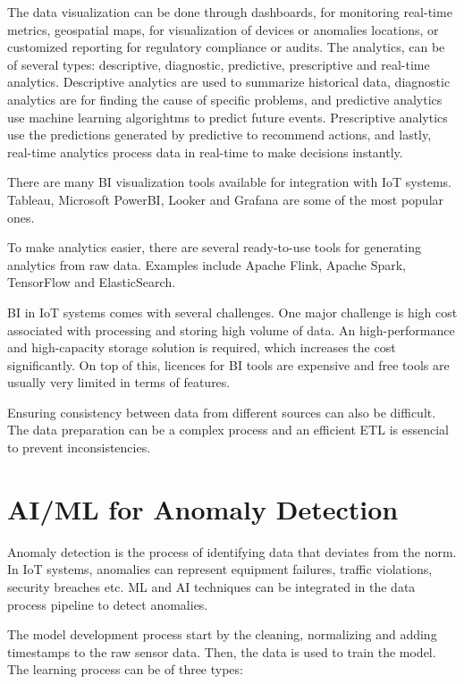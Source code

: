 The data visualization can be done through dashboards, for monitoring real-time
metrics, geospatial maps, for visualization of devices or anomalies locations,
or customized reporting for regulatory compliance or audits. The analytics, can
be of several types: descriptive, diagnostic, predictive, prescriptive and
real-time analytics. Descriptive analytics are used to summarize historical
data, diagnostic analytics are for finding the cause of specific problems, and
predictive analytics use machine learning algorightms to predict future events.
Prescriptive analytics use the predictions generated by predictive to recommend
actions, and lastly, real-time analytics process data in real-time to make
decisions instantly.

There are many \gls{BI} visualization tools available for integration with \gls{IoT} systems.
Tableau, Microsoft PowerBI, Looker and Grafana are some of the most popular ones.

To make analytics easier, there are several ready-to-use tools for generating
analytics from raw data. Examples include Apache Flink, Apache Spark,
TensorFlow and ElasticSearch.

\gls{BI} in \gls{IoT} systems comes with several challenges.
One major challenge is high cost associated with processing and storing
high volume of data. An high-performance and high-capacity storage
solution is required, which increases the cost significantly. On top of this,
licences for \gls{BI} tools are expensive and free tools are usually very
limited in terms of features.

Ensuring consistency between data from different sources can also be difficult.
The data preparation can be a complex process and an efficient \gls{ETL} is
essencial to prevent inconsistencies.


\section{AI/ML for Anomaly Detection}
Anomaly detection is the process of identifying data that deviates from the norm.
In \gls{IoT} systems, anomalies can represent equipment failures, traffic violations,
security breaches etc. \gls{ML} and \gls{AI} techniques
can be integrated in the data process pipeline to detect anomalies.

The model development process start by the cleaning, normalizing and adding
timestamps to the raw sensor data. Then, the data is used to train the model.
The learning process can be of three types:

